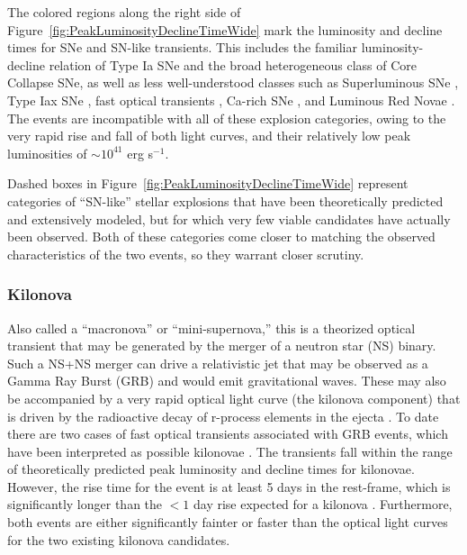 The colored regions along the right side of
Figure~\ref{fig:PeakLuminosityDeclineTimeWide} mark the luminosity and
decline times for SNe and SN-like transients. This includes the
familiar luminosity-decline relation of Type Ia SNe
\citep{Phillips:1993} and the broad heterogeneous class of Core
Collapse SNe, as well as less well-understood classes such as
Superluminous SNe \citep{Gal-Yam:2012,Arcavi:2016}, Type Iax SNe
\citep{Foley:2013a}, fast optical transients \citep{Drout:2014}, Ca-rich SNe \citep{Filippenko:2003,Perets:2011,Kasliwal:2012}, and
Luminous Red Novae \citep[also called intermediate luminosity red
  transients;][]{Munari:2002,Kulkarni:2007,Kasliwal:2011b}.  The \spock
events are incompatible with all of these explosion categories,
owing to the very rapid rise and fall of both \spock light curves, and
their relatively low peak luminosities of $\sim10^{41}$ erg s$^{-1}$.

Dashed boxes in Figure~\ref{fig:PeakLuminosityDeclineTimeWide}
represent categories of ``SN-like'' stellar explosions that have been
theoretically predicted and extensively modeled, but for which very
few viable candidates have actually been observed. Both of these
categories come closer to matching the observed characteristics of the
two \spock events, so they warrant closer scrutiny.

\subsubsection{Kilonova}

Also called a ``macronova'' or ``mini-supernova,'' this is a theorized
optical transient that may be generated by the merger of a neutron
star (NS) binary. Such a NS+NS merger can drive a relativistic jet that may be
observed as a Gamma Ray Burst (GRB) and would emit gravitational
waves.  These may also be accompanied by a very rapid optical light
curve (the kilonova component) that is driven by the radioactive decay
of r-process elements in the ejecta \citep{Li:1998,Kulkarni:2005}.  To
date there are two cases of fast optical transients associated with
GRB events, which have been interpreted as possible kilonovae
\citep{Perley:2009,Tanvir:2013}.  The \spock transients fall within
the range of theoretically predicted peak luminosity and decline times
for kilonovae. However, the rise time for the \spockone event is at
least 5 days in the rest-frame, which is significantly longer than the
$<1$ day rise expected for a kilonova
\citep[e.g.][]{Metzger:2010,Barnes:2013,Kasen:2015}.  Furthermore,
both \spock events are either significantly fainter or faster than the
optical light curves for the two existing kilonova candidates.


